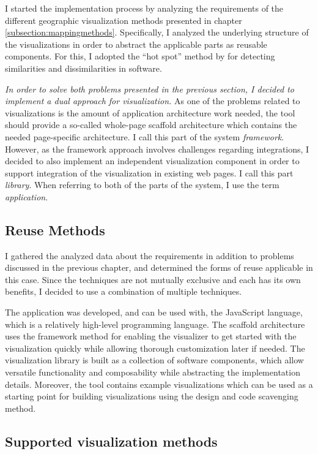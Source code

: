 I started the implementation process by analyzing the requirements of the different geographic visualization methods presented in chapter \ref{subsection:mappingmethods}. Specifically, I analyzed the underlying structure of the visualizations in order to abstract the applicable parts as reusable components. For this, I adopted the ``hot spot'' method by \citet{schmid_systematic_1997} for detecting similarities and dissimilarities in software.

\emph{In order to solve both problems presented in the previous section, I decided to implement a dual approach for visualization.} As one of the problems related to visualizations is the amount of application architecture work needed, the tool should provide a so-called whole-page scaffold architecture \citep{jazayeri_trends_2007} which contains the needed page-specific architecture. I call this part of the system \emph{framework}. However, as the framework approach involves challenges regarding integrations, I decided to also implement an independent visualization component in order to support integration of the visualization in existing web pages. I call this part \emph{library}. When referring to both of the parts of the system, I use the term \emph{application}.

\subsection{Reuse Methods}

I gathered the analyzed data about the requirements in addition to problems discussed in the previous chapter, and determined the forms of reuse applicable in this case. Since the techniques are not mutually exclusive and each has its own benefits, I decided to use a combination of multiple techniques. 

The application was developed, and can be used with, the JavaScript language, which is a relatively high-level programming language. The scaffold architecture uses the framework method for enabling the visualizer to get started with the visualization quickly while allowing thorough customization later if needed. The visualization library is built as a collection of software components, which allow versatile functionality and composability while abstracting the implementation details. Moreover, the tool contains example visualizations which can be used as a starting point for building visualizations using the design and code scavenging method.

\subsection{Supported visualization methods}
\label{subsection:supportedvisualizationmethods}

